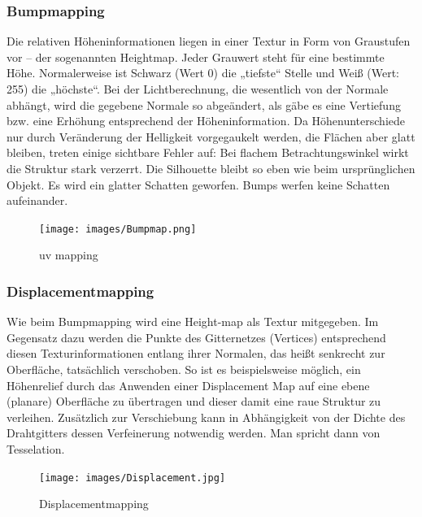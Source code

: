\subsubsection{Bumpmapping}
Die relativen Höheninformationen liegen in einer Textur in Form von Graustufen vor – der sogenannten Heightmap. Jeder Grauwert steht für eine bestimmte Höhe. Normalerweise ist Schwarz (Wert 0) die „tiefste“ Stelle und Weiß (Wert: 255) die „höchste“.  Bei der Lichtberechnung, die wesentlich von der Normale abhängt, wird die gegebene Normale so abgeändert, als gäbe es eine Vertiefung bzw. eine Erhöhung entsprechend der Höheninformation.  Da Höhenunterschiede nur durch Veränderung der Helligkeit vorgegaukelt werden, die Flächen aber glatt bleiben, treten einige sichtbare Fehler auf:
Bei flachem Betrachtungswinkel wirkt die Struktur stark verzerrt.
Die Silhouette bleibt so eben wie beim ursprünglichen Objekt.
Es wird ein glatter Schatten geworfen.
Bumps werfen keine Schatten aufeinander.

\begin{figure}[H]
    \centering
    \texttt{[image: images/Bumpmap.png]}
    \caption{uv mapping} %
    \label{fig:uv-mapping3}
\end{figure}




\subsubsection{Displacementmapping}
Wie beim Bumpmapping  wird  eine Height-map als Textur mitgegeben.
Im Gegensatz dazu werden die Punkte des Gitternetzes (Vertices)  entsprechend diesen Texturinformationen entlang ihrer Normalen, das heißt senkrecht zur Oberfläche, tatsächlich verschoben. So ist es beispielsweise möglich, ein Höhenrelief durch das Anwenden einer Displacement Map auf eine ebene (planare) Oberfläche zu übertragen und dieser damit eine raue Struktur zu verleihen. Zusätzlich zur Verschiebung kann in Abhängigkeit von der Dichte des Drahtgitters dessen Verfeinerung notwendig werden. Man spricht dann von Tesselation.

\begin{figure}[H]
    \centering
    \texttt{[image: images/Displacement.jpg]}
    \caption{Displacementmapping} %
    \label{fig:displacement-mapping}
\end{figure}

